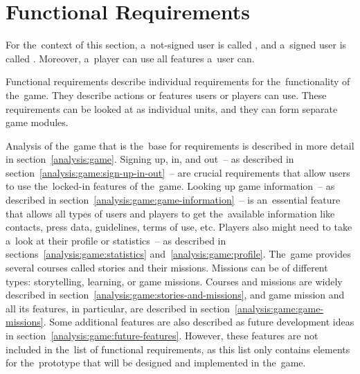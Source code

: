 \section{Functional Requirements}

For the~context of this section, a~not-signed user is called , and a~signed user is called .
Moreover, a~player can use all features a~user can. 

Functional requirements describe individual requirements for the~functionality of the~game.
They describe actions or features users or players can use.
These requirements can be looked at as individual units, and they can form separate game modules.

Analysis of the~game that is the~base for requirements is described in more detail in section~\ref{analysis:game}.
Signing up, in, and out~-- as described in section~\ref{analysis:game:sign-up-in-out}~-- are crucial requirements that allow users to use the~locked-in features of the~game.
Looking up game information~-- as described in section~\ref{analysis:game:game-information}~-- is an~essential feature that allows all types of users and players to get the~available information like contacts, press data, guidelines, terms of use, etc.
Players also might need to take a~look at their profile or statistics~-- as described in sections~\ref{analysis:game:statistics} and~\ref{analysis:game:profile}.
The~game provides several courses called stories and their missions.
Missions can be of different types: storytelling, learning, or game missions.
Courses and missions are widely described in section~\ref{analysis:game:stories-and-missions}, and game mission and all its features, in particular, are described in section~\ref{analysis:game:game-missions}.
Some additional features are also described as future development ideas in section~\ref{analysis:game:future-features}.
However, these features are not included in the~list of functional requirements, as this list only contains elements for the~prototype that will be designed and implemented in the~game.

